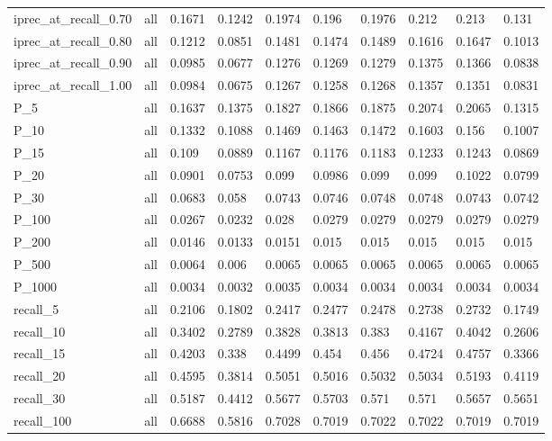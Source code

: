 \begin{table}[h!]
\begin{tabular}{|l|l|l|l|l|l|l|l|l|l|}
        iprec\_at\_recall\_0.70 & all & 0.1671 & 0.1242 & 0.1974 & 0.196 & 0.1976 & 0.212 & 0.213 & 0.131 \\ 
        iprec\_at\_recall\_0.80 & all & 0.1212 & 0.0851 & 0.1481 & 0.1474 & 0.1489 & 0.1616 & 0.1647 & 0.1013 \\ 
        iprec\_at\_recall\_0.90 & all & 0.0985 & 0.0677 & 0.1276 & 0.1269 & 0.1279 & 0.1375 & 0.1366 & 0.0838 \\ 
        iprec\_at\_recall\_1.00 & all & 0.0984 & 0.0675 & 0.1267 & 0.1258 & 0.1268 & 0.1357 & 0.1351 & 0.0831 \\ \midrule
        P\_5 & all & 0.1637 & 0.1375 & 0.1827 & 0.1866 & 0.1875 & 0.2074 & 0.2065 & 0.1315 \\ 
        P\_10 & all & 0.1332 & 0.1088 & 0.1469 & 0.1463 & 0.1472 & 0.1603 & 0.156 & 0.1007 \\ 
        P\_15 & all & 0.109 & 0.0889 & 0.1167 & 0.1176 & 0.1183 & 0.1233 & 0.1243 & 0.0869 \\ 
        P\_20 & all & 0.0901 & 0.0753 & 0.099 & 0.0986 & 0.099 & 0.099 & 0.1022 & 0.0799 \\ 
        P\_30 & all & 0.0683 & 0.058 & 0.0743 & 0.0746 & 0.0748 & 0.0748 & 0.0743 & 0.0742 \\ 
        P\_100 & all & 0.0267 & 0.0232 & 0.028 & 0.0279 & 0.0279 & 0.0279 & 0.0279 & 0.0279 \\ 
        P\_200 & all & 0.0146 & 0.0133 & 0.0151 & 0.015 & 0.015 & 0.015 & 0.015 & 0.015 \\ 
        P\_500 & all & 0.0064 & 0.006 & 0.0065 & 0.0065 & 0.0065 & 0.0065 & 0.0065 & 0.0065 \\ 
        P\_1000 & all & 0.0034 & 0.0032 & 0.0035 & 0.0034 & 0.0034 & 0.0034 & 0.0034 & 0.0034 \\ \midrule
        recall\_5 & all & 0.2106 & 0.1802 & 0.2417 & 0.2477 & 0.2478 & 0.2738 & 0.2732 & 0.1749 \\ 
        recall\_10 & all & 0.3402 & 0.2789 & 0.3828 & 0.3813 & 0.383 & 0.4167 & 0.4042 & 0.2606 \\ 
        recall\_15 & all & 0.4203 & 0.338 & 0.4499 & 0.454 & 0.456 & 0.4724 & 0.4757 & 0.3366 \\ 
        recall\_20 & all & 0.4595 & 0.3814 & 0.5051 & 0.5016 & 0.5032 & 0.5034 & 0.5193 & 0.4119 \\ 
        recall\_30 & all & 0.5187 & 0.4412 & 0.5677 & 0.5703 & 0.571 & 0.571 & 0.5657 & 0.5651 \\ 
        recall\_100 & all & 0.6688 & 0.5816 & 0.7028 & 0.7019 & 0.7022 & 0.7022 & 0.7019 & 0.7019 \\ 

\end{tabular}
\end{table}
